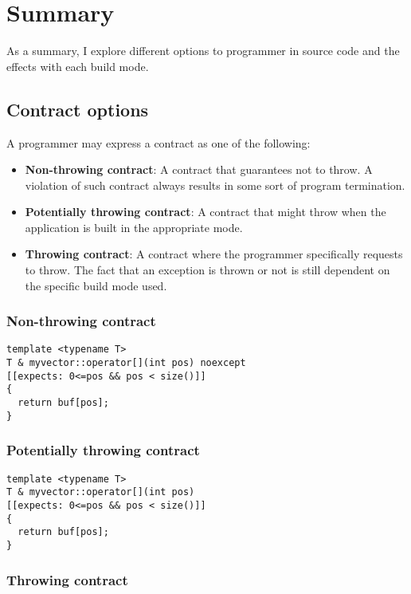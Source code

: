 \section{Summary}

As a summary, I explore different options to programmer in source code and the
effects with each build mode.

\subsection{Contract options}

A programmer may express a contract as one of the following:

\begin{itemize}
  \item \textbf{Non-throwing contract}: A contract that guarantees not to
throw. A violation of such contract always results in some sort of program
termination.

  \item \textbf{Potentially throwing contract}: A contract that might throw when
the application is built in the appropriate mode.

  \item \textbf{Throwing contract}: A contract where the programmer specifically
requests to throw. The fact that an exception is thrown or not is still
dependent on the specific build mode used.
\end{itemize}

\subsubsection{Non-throwing contract}

\begin{lstlisting}
template <typename T>
T & myvector::operator[](int pos) noexcept
[[expects: 0<=pos && pos < size()]]
{
  return buf[pos];
}
\end{lstlisting}

\subsubsection{Potentially throwing contract}

\begin{lstlisting}
template <typename T>
T & myvector::operator[](int pos) 
[[expects: 0<=pos && pos < size()]]
{
  return buf[pos];
}
\end{lstlisting}

\subsubsection{Throwing contract}

